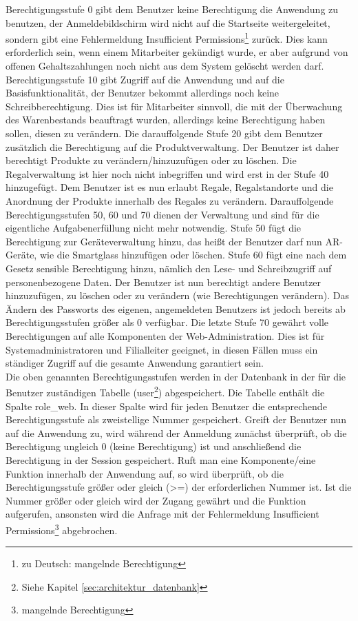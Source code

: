 Berechtigungsstufe 0 gibt dem Benutzer keine Berechtigung die Anwendung zu benutzen, der Anmeldebildschirm wird nicht auf die Startseite weitergeleitet, sondern gibt eine Fehlermeldung \glqq Insufficient Permissions\grqq\footnote{zu Deutsch: \glqq mangelnde Berechtigung\grqq} zurück. Dies kann erforderlich sein, wenn einem Mitarbeiter gekündigt wurde, er aber aufgrund von \zB offenen Gehaltszahlungen noch nicht aus dem System gelöscht werden darf. Berechtigungsstufe 10 gibt Zugriff auf die Anwendung und auf die Basisfunktionalität, der Benutzer bekommt allerdings noch keine Schreibberechtigung. Dies ist für Mitarbeiter sinnvoll, die mit der Überwachung des Warenbestands beauftragt wurden, allerdings keine Berechtigung haben sollen, diesen zu verändern. Die darauffolgende Stufe 20 gibt dem Benutzer zusätzlich die Berechtigung auf die Produktverwaltung. Der Benutzer ist daher berechtigt Produkte zu verändern/hinzuzufügen oder zu löschen. Die Regalverwaltung ist hier noch nicht inbegriffen und wird erst in der Stufe 40 hinzugefügt. Dem Benutzer ist es nun erlaubt Regale, Regalstandorte und die Anordnung der Produkte innerhalb des Regales zu verändern. Darauffolgende Berechtigungsstufen 50, 60 und 70 dienen der Verwaltung und sind für die eigentliche Aufgabenerfüllung nicht mehr notwendig. Stufe 50 fügt die Berechtigung zur Geräteverwaltung hinzu, das heißt der Benutzer darf nun \ac{AR}-Geräte, wie \zB die Smartglass hinzufügen oder löschen. Stufe 60 fügt eine nach dem Gesetz sensible Berechtigung hinzu, nämlich den Lese- und Schreibzugriff auf personenbezogene Daten. Der Benutzer ist nun berechtigt andere Benutzer hinzuzufügen, zu löschen oder zu verändern (wie \zB Berechtigungen verändern). Das Ändern des Passworts des eigenen, angemeldeten Benutzers ist jedoch bereits ab Berechtigungsstufen größer als 0 verfügbar. Die letzte Stufe 70 gewährt volle Berechtigungen auf alle Komponenten der Web-Administration. Dies ist für Systemadministratoren und Filialleiter geeignet, in diesen Fällen muss ein ständiger Zugriff auf die gesamte Anwendung garantiert sein.\\

Die oben genannten Berechtigungsstufen werden in der Datenbank in der für die Benutzer zuständigen Tabelle (user\footnote{Siehe Kapitel \ref{sec:architektur_datenbank} }) abgespeichert. Die Tabelle enthält die Spalte role\_web. In dieser Spalte wird für jeden Benutzer die entsprechende Berechtigungsstufe als zweistellige Nummer gespeichert. Greift der Benutzer nun auf die Anwendung zu, wird während der Anmeldung zunächst überprüft, ob die Berechtigung ungleich 0 (keine Berechtigung) ist und anschließend die Berechtigung in der Session gespeichert. Ruft man eine Komponente/eine Funktion innerhalb der Anwendung auf, so wird überprüft, ob die Berechtigungsstufe größer oder gleich (>=) der erforderlichen Nummer ist. Ist die Nummer größer oder gleich wird der Zugang gewährt und die Funktion aufgerufen, ansonsten wird die Anfrage mit der Fehlermeldung \glqq Insufficient Permissions\grqq\footnote{\glqq mangelnde Berechtigung\grqq} abgebrochen.\\